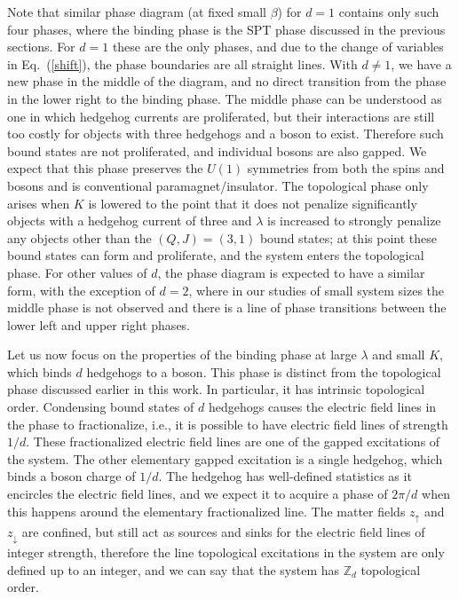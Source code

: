 Note that similar phase diagram (at fixed small $\beta$) for $d=1$ contains only such four phases, where the binding phase is the SPT phase discussed in the previous sections. For $d=1$ these are the only phases, and due to the change of variables in Eq.~(\ref{shift}), the phase boundaries are all straight lines.
With $d\neq 1$, we have a new phase in the middle of the diagram, and no direct transition from the phase in the lower right to the binding phase. The middle phase can be understood as one in which hedgehog currents are proliferated, but their interactions are still too costly for objects with three hedgehogs and a boson to exist. Therefore such bound states are not proliferated, and individual bosons are also gapped.  We expect that this phase preserves the $U(1)$ symmetries from both the spins and bosons and is conventional paramagnet/insulator. The topological phase only arises when $K$ is lowered to the point that it does not penalize significantly objects with a hedgehog current of three and $\lambda$ is increased to strongly penalize any objects other than the $(Q, J) = (3, 1)$ bound states; at this point these bound states can form and proliferate, and the system enters the topological phase. For other values of $d$, the phase diagram is expected to have a similar form, with the exception of $d=2$, where in our studies of small system sizes the middle phase is not observed and there is a line of phase transitions between the lower left and upper right phases.

Let us now focus on the properties of the binding phase at large $\lambda$ and small $K$, which binds $d$ hedgehogs to a boson. This phase is distinct from the topological phase discussed earlier in this work. In particular, it has intrinsic topological order. Condensing bound states of $d$ hedgehogs causes the electric field lines in the phase to fractionalize, i.e., it is possible to have electric field lines of strength $1/d$. These fractionalized electric field lines are one of the gapped excitations of the system. The other elementary gapped excitation is a single hedgehog, which binds a boson charge of $1/d$. The hedgehog has well-defined statistics as it encircles the electric field lines, and we expect it to acquire a phase of $2\pi/d$ when this happens around the elementary fractionalized line. The matter fields $z_\uparrow$ and $z_\downarrow$ are confined, but still act as sources and sinks for the electric field lines of integer strength, therefore the line topological excitations in the system are only defined up to an integer, and we can say that the system has $\mathbb{Z}_d$ topological order.\cite{GukovKapustin,FracFaraday} 

